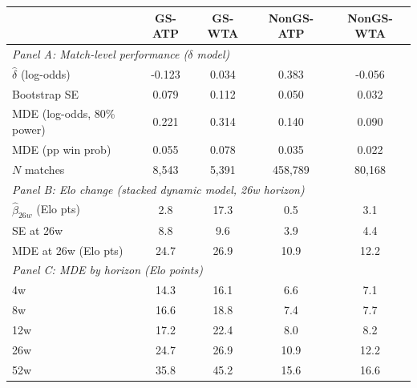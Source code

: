 \begin{tabular}{lcccc}
\toprule
 & GS-ATP & GS-WTA & NonGS-ATP & NonGS-WTA \\
\midrule
\multicolumn{5}{l}{\textit{Panel A: Match-level performance ($\delta$ model)}} \\
$\hat{\delta}$ (log-odds) & -0.123 & 0.034 & 0.383 & -0.056 \\
Bootstrap SE & 0.079 & 0.112 & 0.050 & 0.032 \\
MDE (log-odds, 80\% power) & 0.221 & 0.314 & 0.140 & 0.090 \\
MDE (pp win prob) & 0.055 & 0.078 & 0.035 & 0.022 \\
$N$ matches & 8,543 & 5,391 & 458,789 & 80,168 \\
\midrule
\multicolumn{5}{l}{\textit{Panel B: Elo change (stacked dynamic model, 26w horizon)}} \\
$\hat{\beta}_{26w}$ (Elo pts) & 2.8 & 17.3 & 0.5 & 3.1 \\
SE at 26w & 8.8 & 9.6 & 3.9 & 4.4 \\
MDE at 26w (Elo pts) & 24.7 & 26.9 & 10.9 & 12.2 \\
\midrule
\multicolumn{5}{l}{\textit{Panel C: MDE by horizon (Elo points)}} \\
\quad 4w & 14.3 & 16.1 & 6.6 & 7.1 \\
\quad 8w & 16.6 & 18.8 & 7.4 & 7.7 \\
\quad 12w & 17.2 & 22.4 & 8.0 & 8.2 \\
\quad 26w & 24.7 & 26.9 & 10.9 & 12.2 \\
\quad 52w & 35.8 & 45.2 & 15.6 & 16.6 \\
\bottomrule
\end{tabular}
